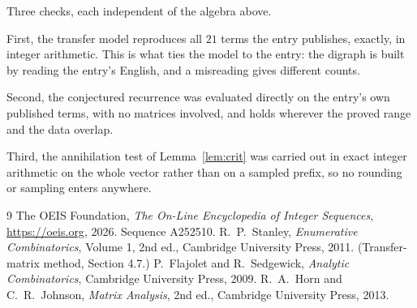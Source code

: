 \documentclass[11pt,a4paper]{article}
\theoremstyle{plain}
\theoremstyle{definition}
\begin{document}
Three checks, each independent of the algebra above.

First, the transfer model reproduces all $21$ terms the entry publishes, exactly, in
integer arithmetic. This is what ties the model to the entry: the digraph is built by reading
the entry's English, and a misreading gives different counts.

Second, the conjectured recurrence was evaluated directly on the entry's own published terms,
with no matrices involved, and holds wherever the proved range and the data overlap.

Third, the annihilation test of Lemma~\ref{lem:crit} was carried out in exact integer
arithmetic on the whole vector rather than on a sampled prefix, so no rounding or sampling
enters anywhere.

\begin{thebibliography}{9}
 The OEIS Foundation, \emph{The On-Line Encyclopedia of Integer
Sequences}, \url{https://oeis.org}, 2026. Sequence A252510.
 R.~P.~Stanley, \emph{Enumerative Combinatorics}, Volume 1, 2nd ed.,
Cambridge University Press, 2011. (Transfer-matrix method, Section 4.7.)
 P.~Flajolet and R.~Sedgewick, \emph{Analytic Combinatorics}, Cambridge
University Press, 2009.
 R.~A.~Horn and C.~R.~Johnson, \emph{Matrix Analysis}, 2nd ed., Cambridge
University Press, 2013.
\end{thebibliography}
\end{document}
